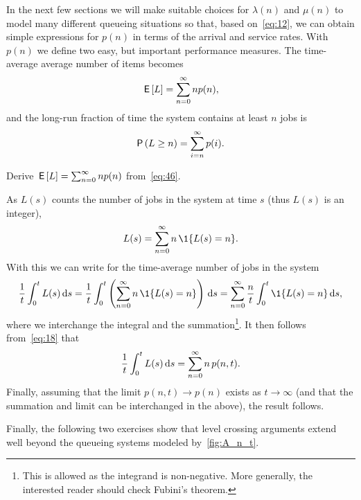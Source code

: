 In the next few sections we will make suitable choices for $\lambda(n)$ and $\mu(n)$ to model many different queueing situations so that, based on~\cref{eq:12}, we can obtain simple expressions for $p(n)$ in terms of the arrival and service rates.
With $p(n)$ we define  two easy, but important performance measures. The time-average average number of items becomes
\begin{equation*}
\,\mathsf{E}\left[L\right] = \sum_{n=0}^\infty n p(n),
\end{equation*}
and the long-run fraction of time the system contains at least $n$ jobs is
\begin{equation*}
  \P{ L \geq n} = \sum_{i=n}^\infty p(i).
\end{equation*}

\begin{exercise}
  Derive  $\,\mathsf{E}\left[L\right] = \sum_{n=0}^\infty n p(n)$ from~\cref{eq:46}. 
\begin{solution}
As $L(s)$ counts the number of jobs in the system at time $s$ (thus $L(s)$ is an integer),
\begin{equation*}
  L(s) = \sum_{n=0}^\infty n\, \1{L(s) = n}.
\end{equation*}
With this we can write for the time-average number of jobs in the system
\begin{equation}\label{eq:1}
\frac 1 t \int_0^t L(s) \d s = \frac 1 t \int_0^t \left(\sum_{n=0}^{\infty} n\, \1{L(s) = n}\right) \d s
= \sum_{n=0}^{\infty} \frac n t \int_0^t   \1{L(s) = n} \d s,
\end{equation}
where we interchange the integral and the summation\footnote{This is allowed as the integrand is non-negative.
  More generally, the interested reader should check Fubini's theorem.}.
It then follows from~\cref{eq:18} that
\begin{equation*}
\frac 1 t \int_0^t L(s) \,\text{d}s =  \sum_{n=0}^{\infty} n\, p(n,t).
\end{equation*}
Finally, assuming that the limit $p(n,t) \to p(n)$ exists as
$t\to\infty$ (and that the summation and limit can be interchanged in
the above), the result follows.
\end{solution}
\end{exercise}






Finally, the following two exercises show that level crossing arguments extend well beyond the queueing systems modeled by~\cref{fig:A_n_t}.

